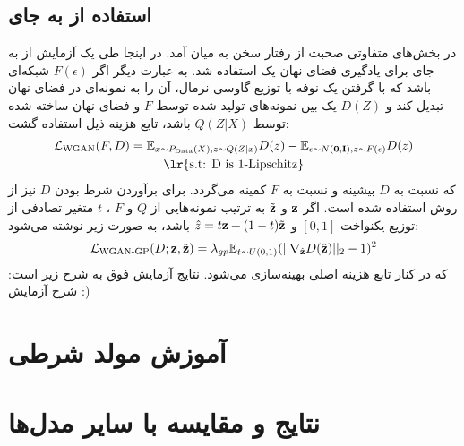 \subsection{استفاده از  \gan{} به جای \mmd{}}
در بخش‌های متفاوتی صحبت از رفتار \modecollapse{} 
\gan{}
سخن به میان آمد. در اینجا طی یک آزمایش از  به جای \mmd{} برای یادگیری فضای نهان یک \autoencoder{} استفاده شد. به عبارت دیگر اگر $F(\epsilon)$ شبکه‌ای باشد که با گرفتن یک نوفه با توزیع گاوسی نرمال، آن را به نمونه‌ای در فضای نهان تبدیل کند و $D(Z)$ یک \critic{} بین نمونه‌های تولید شده توسط $F$ و فضای نهان ساخته شده توسط \encoder{} 
$Q(Z|X)$
باشد، تابع هزینه ذیل استفاده گشت:
\begin{gather}
 \mathcal{L}_\text{WGAN} (F, D)= 
   \expected_{x \sim P_\text{Data}(X), z \sim Q(Z|x)} D(z)
 - \expected_{\epsilon \sim N(\bff{0}, \bff{I}), z \sim F(\epsilon)} D(z)
  \\
\text{\lr{s.t: D is 1-Lipschitz}} \nonumber
\end{gather}
که نسبت به $D$ بیشینه و نسبت به $F$ کمینه می‌گردد. برای برآوردن شرط  بودن $D$ نیز از روش  استفاده شده است. اگر ${\bf z}$ و $\tilde{{\bf z}}$ به ترتیب نمونه‌هایی از $Q$ و $F$ ،
 $t$
  متغیر تصادفی از توزیع یکنواخت $[0,1]$ و 
  $\hat{z} = t{\bf z} + (1 - t) \tilde{{\bf z}}$
  باشد،  به صورت زیر نوشته می‌شود:
\begin{gather}
\mathcal{L}_\text{WGAN-GP} (D; {\bf z}, \tilde{{\bf z}}) = \lambda_{gp} \mathbb E_{t \sim U(0, 1)}
(|| \nabla_{\hat{{\bf z}}} D(\hat{{\bf z}}) ||_2  - 1)^2
\end{gather}
که در کنار تابع هزینه اصلی بهینه‌سازی می‌شود. نتایج آزمایش فوق به شرح زیر است:
شرح آزمایش :)
\\

\section{آموزش مولد شرطی}

\section{نتایج و مقایسه با سایر مدل‌ها} 